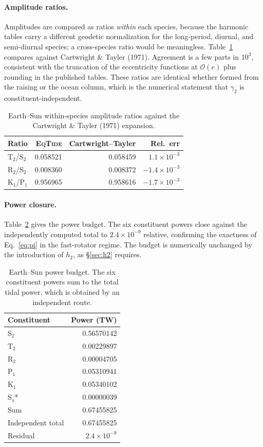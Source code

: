 \documentclass[11pt]{article}
\newcommand{\eqtide}{\textsc{EqTide}}
\begin{document}
\paragraph{Amplitude ratios.} Amplitudes are compared as ratios \emph{within}
each species, because the harmonic tables carry a different geodetic
normalization for the long-period, diurnal, and semi-diurnal species; a
cross-species ratio would be meaningless. Table~\ref{tab:earthratios} compares
against Cartwright \& Tayler (1971). Agreement is a few parts in $10^3$,
consistent with the truncation of the eccentricity functions at
$\mathcal{O}(e)$ plus rounding in the published tables. These ratios are
identical whether formed from the raising or the ocean column, which is the
numerical statement that $\gamma_2$ is constituent-independent.

\begin{table}[h]
\centering
\caption{Earth--Sun within-species amplitude ratios against the
Cartwright \& Tayler (1971) expansion.}
\label{tab:earthratios}
\begin{tabular}{lrrr}
\toprule
Ratio & \eqtide & Cartwright--Tayler & Rel.\ err \\
\midrule
T$_2$/S$_2$ & 0.058521 & 0.058459 & $1.1\times10^{-3}$ \\
R$_2$/S$_2$ & 0.008360 & 0.008372 & $-1.4\times10^{-3}$ \\
K$_1$/P$_1$ & 0.956965 & 0.958616 & $-1.7\times10^{-3}$ \\
\bottomrule
\end{tabular}
\end{table}

\paragraph{Power closure.} Table~\ref{tab:earthpower} gives the power budget.
The six constituent powers close against the independently computed total to
$2.4\times10^{-9}$ relative, confirming the exactness of Eq.~\eqref{eq:pi} in
the fast-rotator regime. The budget is numerically unchanged by the
introduction of $h_2$, as \S\ref{sec:h2} requires.

\begin{table}[h]
\centering
\caption{Earth--Sun power budget. The six constituent powers sum to the total
tidal power, which is obtained by an independent route.}
\label{tab:earthpower}
\begin{tabular}{lr}
\toprule
Constituent & Power (TW) \\
\midrule
S$_2$ & 0.56570142 \\
T$_2$ & 0.00229897 \\
R$_2$ & 0.00004705 \\
P$_1$ & 0.05310941 \\
K$_1$ & 0.05340102 \\
S$_\mathrm{a}$* & 0.00000039 \\
\midrule
Sum & 0.67455825 \\
Independent total & 0.67455825 \\
Residual & $2.4\times10^{-9}$ \\
\bottomrule
\end{tabular}
\end{table}
\end{document}
